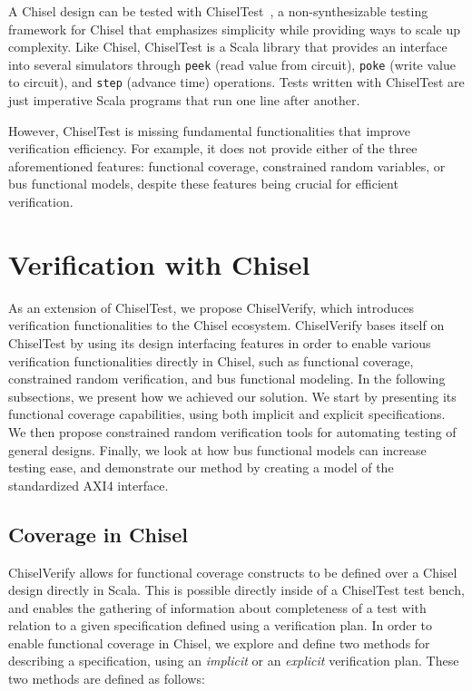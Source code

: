\documentclass[conference]{IEEEtran}
\begin{document}
A Chisel design can be tested with ChiselTest~\cite{chisel:tester2}, a non-synthesizable 
testing framework for Chisel that emphasizes simplicity while providing ways to scale up 
complexity. Like Chisel, ChiselTest is a Scala library that provides an interface into several 
simulators through \texttt{peek} (read value from circuit), \texttt{poke} (write value to 
circuit), and \texttt{step} (advance time) operations. Tests written with ChiselTest are just 
imperative Scala programs that run one line after another.


However, ChiselTest is missing fundamental functionalities that improve verification efficiency. 
For example, it does not provide either of the three aforementioned features: functional 
coverage, constrained random variables, or bus functional models, despite these features being 
crucial for efficient verification.

\section{Verification with Chisel}
\label{sec:verify}

As an extension of ChiselTest, we propose ChiselVerify, which introduces verification functionalities to the Chisel ecosystem.
ChiselVerify bases itself on ChiselTest by using its design interfacing features in order to enable various verification functionalities directly in Chisel, such as functional coverage, constrained random verification, and bus functional modeling. 
In the following subsections, we present how we achieved our solution.
We start by presenting its functional coverage capabilities,  using both implicit and explicit specifications.
We then propose constrained random verification tools for automating testing of general designs.
Finally, we look at how bus functional models can increase testing ease, and demonstrate our method by creating a model of the standardized AXI4 interface. 


\subsection{Coverage in Chisel}
ChiselVerify allows for functional coverage constructs to be defined over a Chisel design directly in Scala. 
This is possible directly inside of a ChiselTest test bench, and enables the gathering of information about completeness of a test with relation to a given specification defined using a verification plan.
In order to enable functional coverage in Chisel, we explore and define two methods for describing a specification, using an \emph{implicit} or an \emph{explicit} verification plan.
These two methods are defined as follows:
\end{document}
